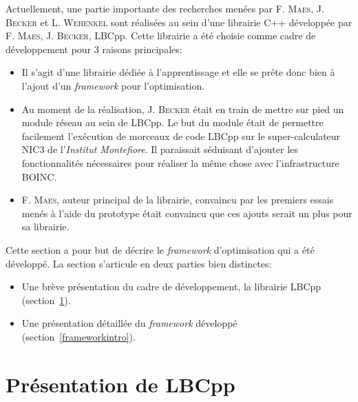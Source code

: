 \documentclass[a4paper, 11pt]{report}
\begin{document}
Actuellement, une partie importante des recherches menées par F. \textsc{Maes}, J. \textsc{Becker} et L. \textsc{Wehenkel} sont réalisées au sein d'une librairie C++ développée par F. \textsc{Maes}, J. \textsc{Becker}, LBCpp. Cette librairie a été choisie comme cadre de développement pour 3 raisons principales:
\begin{itemize}
\item Il s'agit d'une librairie dédiée à l'apprentissage et elle se prête donc bien à l'ajout d'un \textit{framework} pour l'optimisation.
\item Au moment de la réalisation, J. \textsc{Becker} était en train de mettre sur pied un module réseau au sein de LBCpp. Le but du module était de permettre facilement l'exécution de morceaux de code LBCpp sur le super-calculateur NIC3 de l'\textit{Institut Montefiore}. Il paraissait séduisant d'ajouter les fonctionnalités nécessaires pour réaliser la même chose avec l'infrastructure \textsc{BOINC}.
\item F. \textsc{Maes}, auteur principal de la librairie, convaincu par les premiers essais menés à l'aide du prototype était convaincu que ces ajouts serait un plus pour sa librairie.
\end{itemize}

Cette section a pour but de décrire le \textit{framework} d'optimisation qui a été développé. La section s'articule en deux parties bien distinctes:
\begin{itemize}
\item Une brève présentation du cadre de développement, la librairie LBCpp (section~\ref{LBCpp}).
\item Une présentation détaillée du \textit{framework} développé (section~\ref{frameworkintro}).
\end{itemize}

\section{Présentation de LBCpp}
\label{LBCpp}
\end{document}
